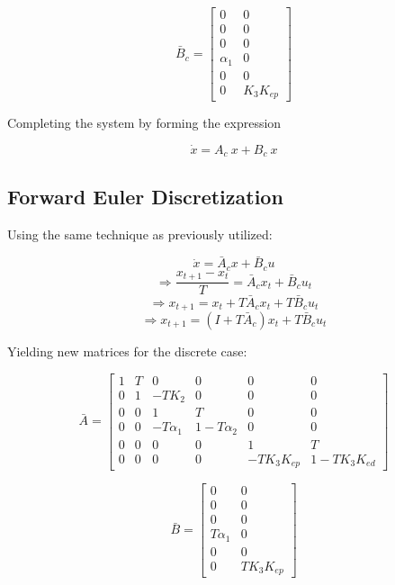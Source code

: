 \begin{equation}
\bar{B}_c =
\begin{bmatrix}
    0 & 0\\
    0 & 0 \\
    0 & 0 \\
    \alpha_1 & 0 \\
    0 & 0 \\
    0 & K_3K_{ep}
\end{bmatrix}
\end{equation}

Completing the system by forming the expression

\begin{equation}
\dot{x} = A_c\ x + B_c\ x
\end{equation}

\subsection{Forward Euler Discretization}

Using the same technique as previously utilized:

$$ \dot{x} = \bar{A}_c x + \bar{B}_c u $$
$$ \Rightarrow \frac{x_{t+1} - x_t}{T} = \bar{A}_c x_t + \bar{B}_c u_t $$
$$ \Rightarrow x_{t+1} = x_t + T\bar{A}_c x_t + T\bar{B}_c u_t $$
$$ \Rightarrow x_{t+1} = (I + T\bar{A}_c) x_t + T\bar{B}_c u_t $$

Yielding new matrices for the discrete case:

\begin{equation}
\bar{A} =
\begin{bmatrix}
    1 & T & 0 & 0 & 0 & 0 \\
    0 & 1 & -TK_2 & 0 & 0 & 0 \\
    0 & 0 & 1 & T & 0 & 0 \\
    0 & 0 & -T\alpha_1 & 1-T\alpha_2 & 0 & 0 \\
    0 & 0 & 0 & 0 & 1 & T \\
    0 & 0 & 0 & 0 & -TK_3K_{ep} & 1-TK_3K_{ed}
\end{bmatrix}
\end{equation}

\begin{equation}
\bar{B} =
\begin{bmatrix}
    0 & 0 \\
    0 & 0 \\
    0 & 0 \\
    T\alpha_1 & 0 \\
    0 & 0 \\
    0 & TK_3K_{ep}
\end{bmatrix}
\end{equation}

